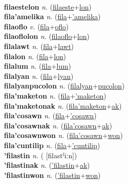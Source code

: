  \label{filaeste} \\
\textbf{filaestelon} \textit{n.} (\hyperref[filaeste]{filaeste}+\hyperref[lon]{lon})
 \label{filaestelon} \\
\textbf{fila'amelika} \textit{n.} (\hyperref[fila]{fila}+\hyperref['amelika]{'amelika})
 \label{fila'amelika} \\
\textbf{filaoflo} \textit{v.} (\hyperref[fila]{fila}+\hyperref[oflo]{oflo})
 \label{filaoflo} \\
\textbf{filaoflolon} \textit{n.} (\hyperref[filaoflo]{filaoflo}+\hyperref[lon]{lon})
 \label{filaoflolon} \\
\textbf{filalawt} \textit{n.} (\hyperref[fila]{fila}+\hyperref[lawt]{lawt})
 \label{filalawt} \\
\textbf{filalon} \textit{n.} (\hyperref[fila]{fila}+\hyperref[lon]{lon})
 \label{filalon} \\
\textbf{filalum} \textit{n.} (\hyperref[fila]{fila}+\hyperref[lum]{lum})
 \label{filalum} \\
\textbf{filalyan} \textit{n.} (\hyperref[fila]{fila}+\hyperref[lyan]{lyan})
 \label{filalyan} \\
\textbf{filalyanpucolon} \textit{n.} (\hyperref[filalyan]{filalyan}+\hyperref[pucolon]{pucolon})
 \label{filalyanpucolon} \\
\textbf{fila'maketon} \textit{n.} (\hyperref[fila]{fila}+\hyperref['maketon]{'maketon})
 \label{fila'maketon} \\
\textbf{fila'maketonak} \textit{n.} (\hyperref[fila'maketon]{fila'maketon}+\hyperref[ak]{ak})
 \label{fila'maketonak} \\
\textbf{fila'cosawn} \textit{n.} (\hyperref[fila]{fila}+\hyperref['cosawn]{'cosawn})
 \label{fila'cosawn} \\
\textbf{fila'cosawnak} \textit{n.} (\hyperref[fila'cosawn]{fila'cosawn}+\hyperref[ak]{ak})
 \label{fila'cosawnak} \\
\textbf{fila'cosawnwon} \textit{n.} (\hyperref[fila'cosawn]{fila'cosawn}+\hyperref[won]{won})
 \label{fila'cosawnwon} \\
\textbf{fila'cuntilip} \textit{n.} (\hyperref[fila]{fila}+\hyperref['cuntilip]{'cuntilip})
 \label{fila'cuntilip} \\
\textbf{'filastin} \textit{n.} ( [filastˁiːn])
 \label{'filastin} \\
\textbf{'filastinak} \textit{n.} (\hyperref['filastin]{'filastin}+\hyperref[ak]{ak})
 \label{'filastinak} \\
\textbf{'filastinwon} \textit{n.} (\hyperref['filastin]{'filastin}+\hyperref[won]{won})
